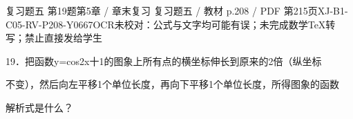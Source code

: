 \begin{bankitem}{复习题五 第19题}{第5章 / 章末复习 复习题五 / 教材 p.208 / PDF 第215页}{XJ-B1-C05-RV-P208-Y0667}{OCR未校对：公式与文字均可能有误；未完成数学TeX转写；禁止直接发给学生}
\begin{ocrdraft}
\par
19．把函数y=cos2x十1的图象上所有点的横坐标伸长到原来的2倍（纵坐标
\par
不变），然后向左平移1个单位长度，再向下平移1个单位长度，所得图象的函数
\par
解析式是什么？
\end{ocrdraft}
\end{bankitem}
